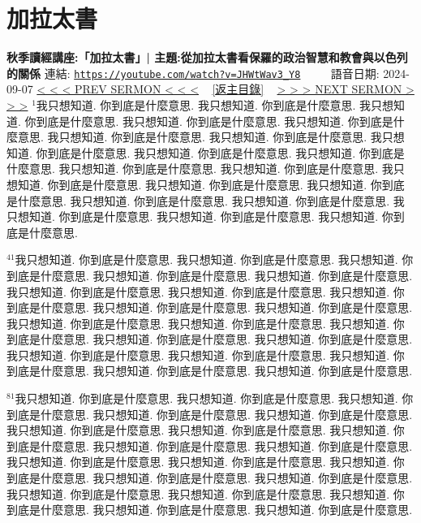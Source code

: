 \documentclass{book}
\begin{document}
\section{加拉太書}
\label{sec:JHWtWav3_Y8}
\textbf{秋季讀經講座:「加拉太書」| 主題:從加拉太書看保羅的政治智慧和教會與以色列的關係}
\newline
\newline
連結: \href{https://youtube.com/watch?v=JHWtWav3_Y8}{\texttt{https://youtube.com/watch?v=JHWtWav3\_Y8}} ~~~~ 語音日期: 2024-09-07
\newline
\newline
\hyperref[sec:I0XYkK_j_N0]{\small{< < < PREV SERMON < < <}}
~
\hyperref[sec:index]{\small{[返主目錄]}}
~
\hyperref[sec:g3ZOKNZeTdE]{\small{> > > NEXT SERMON > > >}}
\newline
\newline
$^{1}$我只想知道.
你到底是什麼意思.
我只想知道.
你到底是什麼意思.
我只想知道.
你到底是什麼意思.
我只想知道.
你到底是什麼意思.
我只想知道.
你到底是什麼意思.
我只想知道.
你到底是什麼意思.
我只想知道.
你到底是什麼意思.
我只想知道.
你到底是什麼意思.
我只想知道.
你到底是什麼意思.
我只想知道.
你到底是什麼意思.
我只想知道.
你到底是什麼意思.
我只想知道.
你到底是什麼意思.
我只想知道.
你到底是什麼意思.
我只想知道.
你到底是什麼意思.
我只想知道.
你到底是什麼意思.
我只想知道.
你到底是什麼意思.
我只想知道.
你到底是什麼意思.
我只想知道.
你到底是什麼意思.
我只想知道.
你到底是什麼意思.
我只想知道.
你到底是什麼意思.

$^{41}$我只想知道.
你到底是什麼意思.
我只想知道.
你到底是什麼意思.
我只想知道.
你到底是什麼意思.
我只想知道.
你到底是什麼意思.
我只想知道.
你到底是什麼意思.
我只想知道.
你到底是什麼意思.
我只想知道.
你到底是什麼意思.
我只想知道.
你到底是什麼意思.
我只想知道.
你到底是什麼意思.
我只想知道.
你到底是什麼意思.
我只想知道.
你到底是什麼意思.
我只想知道.
你到底是什麼意思.
我只想知道.
你到底是什麼意思.
我只想知道.
你到底是什麼意思.
我只想知道.
你到底是什麼意思.
我只想知道.
你到底是什麼意思.
我只想知道.
你到底是什麼意思.
我只想知道.
你到底是什麼意思.
我只想知道.
你到底是什麼意思.
我只想知道.
你到底是什麼意思.

$^{81}$我只想知道.
你到底是什麼意思.
我只想知道.
你到底是什麼意思.
我只想知道.
你到底是什麼意思.
我只想知道.
你到底是什麼意思.
我只想知道.
你到底是什麼意思.
我只想知道.
你到底是什麼意思.
我只想知道.
你到底是什麼意思.
我只想知道.
你到底是什麼意思.
我只想知道.
你到底是什麼意思.
我只想知道.
你到底是什麼意思.
我只想知道.
你到底是什麼意思.
我只想知道.
你到底是什麼意思.
我只想知道.
你到底是什麼意思.
我只想知道.
你到底是什麼意思.
我只想知道.
你到底是什麼意思.
我只想知道.
你到底是什麼意思.
我只想知道.
你到底是什麼意思.
我只想知道.
你到底是什麼意思.
我只想知道.
你到底是什麼意思.
我只想知道.
你到底是什麼意思.
\end{document}
